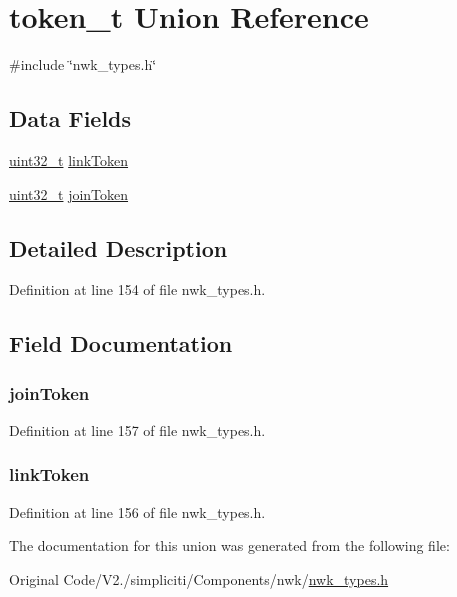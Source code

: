 \hypertarget{uniontoken__t}{\section{token\-\_\-t \-Union \-Reference}
\label{uniontoken__t}
}


{\ttfamily \#include \char`\"{}nwk\-\_\-types.\-h\char`\"{}}

\subsection*{\-Data \-Fields}
\begin{DoxyCompactItemize}
\item 
\hyperlink{bsp__msp430__defs_8h_a06896e8c53f721507066c079052171f8}{uint32\-\_\-t} \hyperlink{uniontoken__t_a3e14395c76be7424b9c4ec8a64f90980}{link\-Token}
\item 
\hyperlink{bsp__msp430__defs_8h_a06896e8c53f721507066c079052171f8}{uint32\-\_\-t} \hyperlink{uniontoken__t_ab456f80b5caa7e3f65f9f51efbb021eb}{join\-Token}
\end{DoxyCompactItemize}


\subsection{\-Detailed \-Description}


\-Definition at line 154 of file nwk\-\_\-types.\-h.



\subsection{\-Field \-Documentation}
\hypertarget{uniontoken__t_ab456f80b5caa7e3f65f9f51efbb021eb}{
\subsubsection[{join\-Token}]{ {\bf join\-Token}}}\label{uniontoken__t_ab456f80b5caa7e3f65f9f51efbb021eb}


\-Definition at line 157 of file nwk\-\_\-types.\-h.

\hypertarget{uniontoken__t_a3e14395c76be7424b9c4ec8a64f90980}{
\subsubsection[{link\-Token}]{ {\bf link\-Token}}}\label{uniontoken__t_a3e14395c76be7424b9c4ec8a64f90980}


\-Definition at line 156 of file nwk\-\_\-types.\-h.



\-The documentation for this union was generated from the following file\-:\begin{DoxyCompactItemize}
\item 
\-Original Code/\-V2./simpliciti/\-Components/nwk/\hyperlink{nwk__types_8h}{nwk\-\_\-types.\-h}\end{DoxyCompactItemize}
